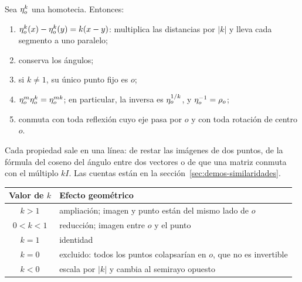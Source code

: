\begin{proposicion}\label{prop:homotecia}
Sea \(\eta_{o}^{k}\) una homotecia. Entonces:
\begin{enumerate}
  \item \(\eta_{o}^{k}(x)-\eta_{o}^{k}(y)=k(x-y)\): multiplica las distancias por \(|k|\) y lleva
  cada segmento a uno paralelo;
  \item conserva los ángulos;
  \item si \(k\neq1\), su único punto fijo es \(o\);
  \item \(\eta_{o}^{m}\eta_{o}^{k}=\eta_{o}^{mk}\); en particular, la inversa es
  \(\eta_{o}^{1/k}\), y \(\eta_{o}^{-1}=\rho_{o}\);
  \item conmuta con toda reflexión cuyo eje pasa por \(o\) y con toda rotación de centro \(o\).
\end{enumerate}
\end{proposicion}

Cada propiedad sale en una línea: de restar las imágenes de dos puntos, de la fórmula del coseno
del ángulo entre dos vectores o de que una matriz conmuta con el múltiplo \(kI\). Las cuentas
están en la sección~\ref{sec:demos-similaridades}.

\begin{center}
\end{center}
\begin{center}
\begin{tabularx}{.92\textwidth}{>{\bfseries}c X}
\toprule
Valor de \(k\) & Efecto geométrico\\
\midrule
\(k>1\) & ampliación; imagen y punto están del mismo lado de \(o\)\\
\(0<k<1\) & reducción; imagen entre \(o\) y el punto\\
\(k=1\) & identidad\\
\(k=0\) & excluido: todos los puntos colapsarían en \(o\), que no es invertible\\
\(k<0\) & escala por \(|k|\) y cambia al semirayo opuesto\\
\bottomrule
\end{tabularx}
\end{center}

